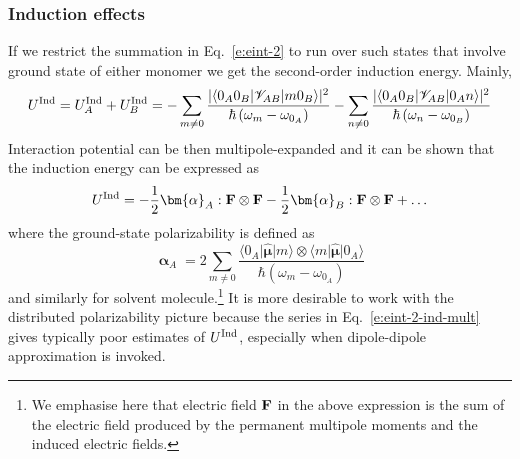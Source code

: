 \documentclass[a4paper,titlepage,twoside,fleqn,12pt]{book}
\newcommand{\BM}[1]{\bm{#1}}
\begin{document}
\begin{refsection}
\subsubsection{Induction effects\label{s:dw-poldisp-pol}}

If we restrict the summation in Eq.~\eqref{e:eint-2} to run over such states
that involve ground state of either monomer
we get the second\hyp{}order induction energy. Mainly,
%
\begin{equation} \label{e:eint-2-ind}
U^{\rm Ind} = U^{\rm Ind}_A + U^{\rm Ind}_B =
- \sum_{m\ne 0} \frac{
\lvert \langle 0_A0_B \lvert \mathscr{V}_{AB} \rvert m0_B \rangle \rvert^2
}{\hbar \left( \omega_{m} - \omega_{0_A}\right)}
%
- \sum_{n\ne 0} \frac{
\lvert \langle 0_A0_B \lvert \mathscr{V}_{AB} \rvert 0_An \rangle \rvert^2
}{\hbar \left( \omega_{n} - \omega_{0_B}\right)}
\end{equation}
%
Interaction potential can be then multipole\hyp{}expanded and
it can be shown that the induction energy
can be expressed as
%
\begin{equation} \label{e:eint-2-ind-mult}
U^{\rm Ind} = - \frac{1}{2} {\BM \alpha}_A : {\bf F} \otimes {\bf F} 
              - \frac{1}{2} {\BM \alpha}_B : {\bf F} \otimes {\bf F} + \ldots
\end{equation}
% 
where the ground\hyp{}state polarizability is defined as
%
\begin{equation} \label{e:polarizability}
{\BM \upalpha}_A = 2\sum_{m\neq 0} \frac{
\langle 0_A \lvert \hat{\BM \mu} \rvert m \rangle \otimes \langle m \lvert \hat{\BM \mu} \rvert 0_A \rangle 
}{\hbar \left( \omega_{m} - \omega_{0_A}\right)}
\end{equation}
%
and similarly for solvent molecule.\footnote{We emphasise here
that electric field $\bf F$ in the above expression
is the sum of the electric field produced by the permanent
multipole moments and the induced electric fields.}
It is more desirable to work with
the distributed polarizability picture because the series in 
Eq.~\eqref{e:eint-2-ind-mult} gives typically poor estimates of $U^{\rm Ind}$,
especially when dipole\hyp{}dipole approximation is invoked. 


\end{refsection}
\end{document}
